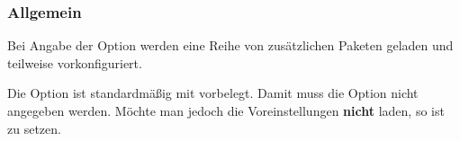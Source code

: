 \documentclass[babel=ngerman,highlight=false]{skdoc}
\begin{document}
            \subsubsection{Allgemein}
                Bei Angabe der Option  werden eine Reihe von zusätzlichen Paketen geladen und teilweise vorkonfiguriert.

                \begin{hint}{}
                    Die Option ist standardmäßig mit  vorbelegt. Damit muss die Option nicht angegeben werden. Möchte man jedoch die Voreinstellungen \textbf{nicht} laden, so ist  zu setzen.
                \end{hint}
\end{document}

